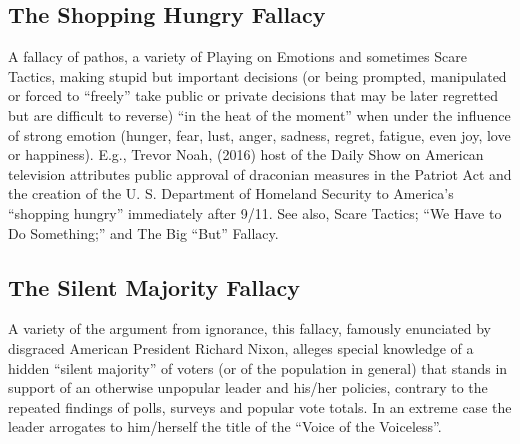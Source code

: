 \documentclass[10pt,a4paper,british]{article}
\begin{document}
\begin{multicols}{2}
    \subsection{The Shopping Hungry Fallacy} A fallacy of pathos, a variety of Playing on Emotions and sometimes Scare Tactics, making stupid but important decisions (or being prompted, manipulated or forced to ``freely'' take public or private decisions that may be later regretted but are difficult to reverse) ``in the heat of the moment'' when  under the influence of strong emotion (hunger, fear, lust, anger, sadness, regret, fatigue, even joy, love or happiness). E.g., Trevor Noah, (2016) host of the Daily Show on American television attributes public approval of draconian measures in the Patriot Act and the creation of the U. S.  Department of Homeland Security to America's ``shopping hungry'' immediately after 9/11. See also, Scare Tactics; ``We Have to Do Something;'' and The Big ``But'' Fallacy.  

    \subsection{The Silent Majority Fallacy} A variety of the argument from ignorance, this fallacy, famously enunciated by disgraced American President Richard Nixon, alleges special knowledge of a hidden ``silent majority'' of voters (or of the population in general) that stands in support of an otherwise unpopular leader and his/her policies, contrary to the repeated findings of polls, surveys and popular vote totals. In an extreme case the leader arrogates to him/herself the title of the ``Voice of the Voiceless''.  


\end{multicols}
\end{document}
